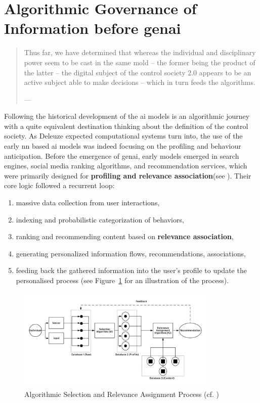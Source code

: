 \section{Algorithmic Governance of Information before \Gls{genai} }

\begin{quote}
	Thus far, we have determined that whereas the individual and disciplinary power seem to be cast in the same mold – the former being the product of the latter – the digital subject of the control society 2.0 appears to be an active subject able to make decisions – which in turn feeds the algorithms.

	— \cite[19]{Krasmann2017}
\end{quote}


Following the historical development of the \gls{ai} models is an algorithmic
journey with a quite equivalent destination thinking about the definition of
the control society. As Deleuze expected computational systems turn into, the
use of the early \gls{nn} based \gls{ai} models was indeed focusing on the
profiling and behaviour anticipation. Before the emergence of \gls{genai}, early models emerged in search engines, social media ranking algorithms, and recommendation services, which were primarily designed for \textbf{profiling and relevance association}(see \cite[26-30]{demir2019}). Their core logic followed a recurrent loop:

\begin{enumerate}
	\item massive data collection from user interactions,
	\item indexing and probabilistic categorization of behaviors,
	\item ranking and recommending content based on \textbf{relevance association},
	\item generating personalized information flows, recommendations,
	      associations,
	\item feeding back the gathered information into the user’s profile to update the personalised process (see Figure~\ref{fig:algosel} for an illustration of the process).
\end{enumerate}

\begin{figure}[htbp]
	\includegraphics[width=0.85\textwidth]{images/AlSel_BA.png}
	\caption{Algorithmic Selection and Relevance Assignment Process (cf. \cite[241]{just2017})}
	\label{fig:algosel}
\end{figure}

